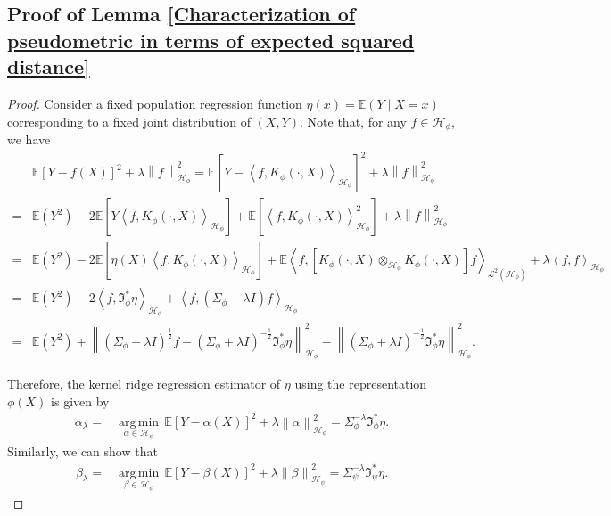 \documentclass[11pt]{article}
\newcommand{\E}{\mathbb{E}}
\newcommand{\I}{\mathfrak{I}}
\newcommand{\HS}{\mathcal{L}^{2}}
\newcommand{\repone}{\phi}
\newcommand{\reptwo}{\psi}
\newcommand{\Hone}{\mathcal{H}_{\phi}}
\newcommand{\Htwo}{\mathcal{H}_{\psi}}
\newcommand{\norm}[1]{\left\|#1\right\|}
\newcommand{\inprod}[1]{\left \langle #1 \right\rangle}
\DeclareMathOperator*{\argmin}{arg\,min}
\theoremstyle{plain}
\begin{document}
\subsection{Proof of Lemma \ref{Characterization of pseudometric in terms of expected squared distance}}\label{Proof of Lemma 1}
\begin{proof}
    Consider a fixed population regression function $\eta(x) = \E(Y \mid X = x)$ corresponding to a fixed joint distribution of $(X, Y)$. Note that, for any $f \in \Hone$, we have
    \[
    \begin{aligned}
        &\E\left[Y-f(X)\right]^{2} + \lambda \norm{f}_{\Hone}^{2}
        = \E\left[Y-\inprod{f,K_{\repone}(\cdot,X)}_{\Hone}\right]^{2} + \lambda \norm{f}_{\Hone}^{2}\\
        =&\E(Y^{2}) - 2\E\left[Y\inprod{f,K_{\repone}(\cdot,X)}_{\Hone}\right] + \E\left[\inprod{f,K_{\repone}(\cdot,X)}_{\Hone}^{2}\right] + \lambda \norm{f}_{\Hone}^{2}\\
        =&\E(Y^{2}) - 2\E\left[\eta(X)\inprod{f,K_{\repone}(\cdot,X)}_{\Hone}\right] + \E\inprod{f,\left[K_{\repone}(\cdot,X) \otimes_{\Hone}K_{\repone}(\cdot,X)\right] f}_{\HS(\Hone)} + \lambda \inprod{f,f}_{\Hone}\\
        =&\E(Y^{2}) -2\inprod{f,\I_{\repone}^{*}\eta}_{\Hone} + \inprod{f,(\Sigma_{\repone}+\lambda I)f}_{\Hone}\\
        =&\E(Y^{2}) + \norm{\left(\Sigma_{\repone}+\lambda I\right)^{\frac{1}{2}}f - \left(\Sigma_{\repone}+\lambda I\right)^{-\frac{1}{2}}\I_{\repone}^{*}\eta}_{\Hone}^{2} - \norm{\left(\Sigma_{\repone}+\lambda I\right)^{-\frac{1}{2}}\I_{\repone}^{*}\eta}_{\Hone}^{2}.
    \end{aligned}
    \]

Therefore, the kernel ridge regression estimator of $\eta$ using the representation $\phi(X)$ is given by 
\[
\begin{aligned}
    \alpha_{\lambda} = & \underset{\alpha \in \Hone}{\argmin} \hspace{2pt} \E\left[Y-\alpha(X)\right]^{2} + \lambda \norm{\alpha}_{\Hone}^{2}
    = \Sigma_{\repone}^{-\lambda}\I_{\repone}^{*}\eta.
\end{aligned}
\]
Similarly, we can show that
\[
\begin{aligned}
    \beta_{\lambda} = & \underset{\beta \in \Htwo}{\argmin} \hspace{2pt} \E\left[Y-\beta(X)\right]^{2} + \lambda \norm{\beta}_{\Htwo}^{2}
    = \Sigma_{\reptwo}^{-\lambda}\I_{\reptwo}^{*}\eta.
\end{aligned}
\]




\end{proof}
\end{document}
